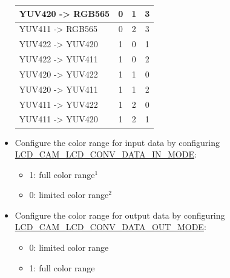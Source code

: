 \documentclass[main\_\_EN.tex]{subfiles}
\begin{document}
\begin{itemize}
\begin{table}[H]
\begin{threeparttable}
\begin{tabular}{|l|c|c|c|}
        YUV420 -> RGB565 & 0 & 1 & 3 \\ \hline
        YUV411 -> RGB565 & 0 & 2 & 3 \\ \hline
        YUV422 -> YUV420 & 1 & 0 & 1 \\ \hline
        YUV422 -> YUV411 & 1 & 0 & 2 \\ \hline
        YUV420 -> YUV422 & 1 & 1 & 0 \\ \hline
        YUV420 -> YUV411 & 1 & 1 & 2 \\ \hline
        YUV411 -> YUV422 & 1 & 2 & 0 \\ \hline
        YUV411 -> YUV420 & 1 & 2 & 1 \\ \hline
        \end{tabular}
     \end{threeparttable}
    \end{table}
    \item Configure the color range for input data by configuring \hyperref[fielddesc:LCDCAMLCDCONVDATAINMODE]{LCD\_CAM\_LCD\_CONV\_DATA\_IN\_MODE}:
    \begin{itemize}
        \item 1: full color range\hyperref[full-color-range-note]{$^1$}
        \item 0: limited color range\hyperref[limited-color-range-note]{$^2$}
    \end{itemize}
    \item Configure the color range for output data by configuring \hyperref[fielddesc:LCDCAMLCDCONVDATAOUTMODE]{LCD\_CAM\_LCD\_CONV\_DATA\_OUT\_MODE}:
    \begin{itemize}
        \item 0: limited color range
        \item 1: full color range
    \end{itemize}
\end{itemize}
\end{document}
